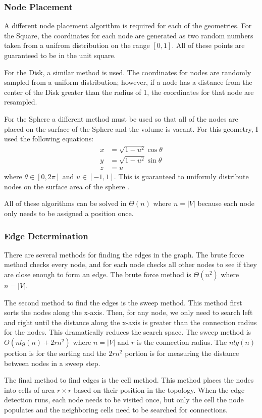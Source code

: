 \documentclass{article}
\begin{document}
        \subsubsection{Node Placement}
        A different node placement algorithm is required for each of the geometries. For the Square, the coordinates for each node are generated as two random numbers taken from a unifrom distribution on the range $[0,1]$. All of these points are guaranteed to be in the unit square.
        \par
        For the Disk, a similar method is used. The coordinates for nodes are randomly sampled from a uniform distribution; however, if a node has a distance from the center of the Disk greater than the radius of 1, the coordinates for that node are resampled.
        \par
        For the Sphere a different method must be used so that all of the nodes are placed on the surface of the Sphere and the volume is vacant. For this geometry, I used the following equations:
        \begin{align}
            x &= \sqrt{1-u^2}\cos\theta \\
            y &= \sqrt{1-u^2}\sin\theta \\
            z &= u
        \end{align}
        where $\theta \in [0,2\pi]$ and $u \in [-1,1]$. This is guaranteed to uniformly distribute nodes on the surface area of the sphere \cite{spherepoints}.
        \par
        All of these algorithms can be solved in $\Theta\left(n\right)$ where $n = |V|$ because each node only needs to be assigned a position once.

        \subsubsection{Edge Determination}
        There are several methods for finding the edges in the graph. The brute force method checks every node, and for each node checks all other nodes to see if they are close enough to form an edge. The brute force method is $\Theta\left(n^2\right)$ where $n = |V|$.
        \par
        The second method to find the edges is the sweep method. This method first sorts the nodes along the x-axis. Then, for any node, we only need to search left and right until the distance along the x-axis is greater than the connection radius for the nodes. This dramatically reduces the search space. The sweep method is $O\left(n lg(n) + 2rn^2\right)$ where $n = |V|$ and $r$ is the connection radius. The $n lg(n)$ portion is for the sorting and the $2rn^2$ portion is for measuring the distance between nodes in a sweep step.
        \par
        The final method to find edges is the cell method. This method places the nodes into cells of area $r \times r$ based on their position in the topology. When the edge detection runs, each node needs to be visited once, but only the cell the node populates and the neighboring cells need to be searched for connections.
\end{document}
